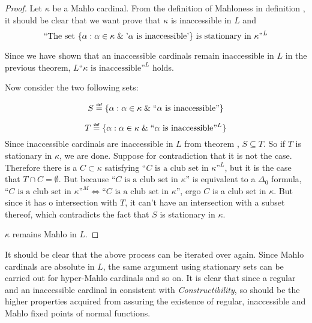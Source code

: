 \begin{proof}
Let $\kappa$ be a Mahlo cardinal. From the definition of Mahloness in definition , it should be clear that we want prove that $\kappa$ is inaccessible in $L$ and 
\begin{equation}
\mbox{``The set }\{\alpha : \alpha \in \kappa \mathrel{\&} \mbox{'$\alpha$ is inaccessible'}\}\mbox{ is stationary in $\kappa$''}^L
\end{equation}

Since we have shown that an inaccessible cardinals remain inaccessible in $L$ in the previous theorem, $L\mbox{``$\kappa$ is inaccessible''}^L$ holds.

Now consider the two following sets:
\bce[(i)]
\item \begin{equation}
S \defeq \{\alpha : \alpha \in \kappa \et \mbox{``$\alpha$ is inaccessible''}\}
\end{equation}
\item \begin{equation}
T \defeq \{\alpha : \alpha \in \kappa \et \mbox{``$\alpha$ is inaccessible''}^L\}
\end{equation} 
\ece 
Since inaccessible cardinals are inaccessible in $L$ from theorem , $S \subseteq T$.
So if $T$ is stationary in $\kappa$, we are done. Suppose for contradiction that it is not the case. 
Therefore there is a $C \subset \kappa$ satisfying $\mbox{``$C$ is a club set in $\kappa$''}^L$, but it is the case that $T \cap C = \emptyset$.
But because $\mbox{``$C$ is a club set in $\kappa$''}$ is equivalent to a $\Delta_0$ formula, $\mbox{``$C$ is a club set in $\kappa$''}^M \iff \mbox{``$C$ is a club set in $\kappa$''}$, ergo $C$ is a club set in $\kappa$. But since it has o intersection with $T$, it can't have an intersection with a subset thereof, which contradicts the fact that $S$ is stationary in $\kappa$.

$\kappa$ remains Mahlo in $L$.
\end{proof}

It should be clear that the above process can be iterated over again. Since Mahlo cardinals are absolute in $L$, the same argument using stationary sets can be carried out for hyper-Mahlo cardinals and so on. It is clear that since a regular and an inaccessible cardinal in consistent with \emph{Constructibility}, so should be the higher properties acquired from assuring the existence of regular, inaccessible and Mahlo fixed points of normal functions.

